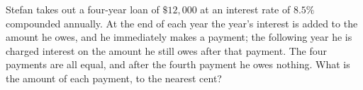 Stefan takes out a four-year loan of $\$12{,}000$ at an interest rate of $8.5\%$ compounded annually. At the end of each year the year's interest is added to the amount he owes, and he immediately makes a payment; the following year he is charged interest on the amount he still owes after that payment. The four payments are all equal, and after the fourth payment he owes nothing. What is the amount of each payment, to the nearest cent?

